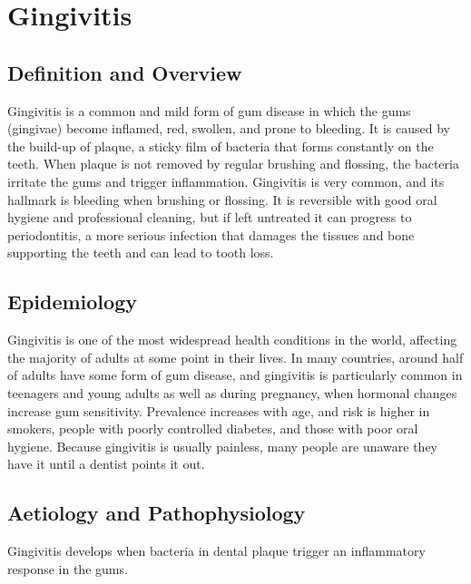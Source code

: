 \chapter{Gingivitis}

\section*{Definition and Overview}
Gingivitis is a common and mild form of gum disease in which the gums (gingivae) become inflamed, red, swollen, and prone to bleeding. It is caused by the build-up of plaque, a sticky film of bacteria that forms constantly on the teeth. When plaque is not removed by regular brushing and flossing, the bacteria irritate the gums and trigger inflammation. Gingivitis is very common, and its hallmark is bleeding when brushing or flossing. It is reversible with good oral hygiene and professional cleaning, but if left untreated it can progress to periodontitis, a more serious infection that damages the tissues and bone supporting the teeth and can lead to tooth loss.

\section*{Epidemiology}
Gingivitis is one of the most widespread health conditions in the world, affecting the majority of adults at some point in their lives. In many countries, around half of adults have some form of gum disease, and gingivitis is particularly common in teenagers and young adults as well as during pregnancy, when hormonal changes increase gum sensitivity. Prevalence increases with age, and risk is higher in smokers, people with poorly controlled diabetes, and those with poor oral hygiene. Because gingivitis is usually painless, many people are unaware they have it until a dentist points it out.

\section*{Aetiology and Pathophysiology}
Gingivitis develops when bacteria in dental plaque trigger an inflammatory response in the gums.

